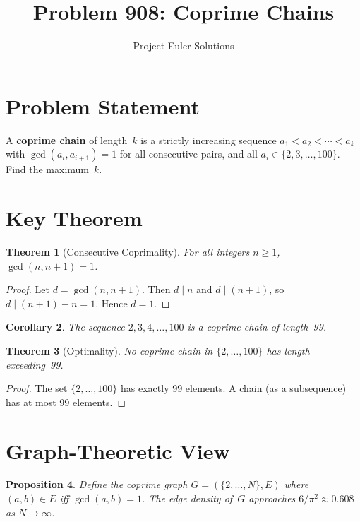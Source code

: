 \documentclass[11pt]{article}
\title{Problem 908: Coprime Chains}
\author{Project Euler Solutions}
\date{}
\newtheorem{theorem}{Theorem}
\newtheorem{corollary}[theorem]{Corollary}
\newtheorem{proposition}[theorem]{Proposition}
\begin{document}
\maketitle

\section{Problem Statement}

A \textbf{coprime chain} of length~$k$ is a strictly increasing sequence $a_1 < a_2 < \cdots < a_k$ with $\gcd(a_i, a_{i+1}) = 1$ for all consecutive pairs, and all $a_i \in \{2, 3, \ldots, 100\}$. Find the maximum~$k$.

\section{Key Theorem}

\begin{theorem}[Consecutive Coprimality]
For all integers $n \ge 1$, $\gcd(n, n+1) = 1$.
\end{theorem}

\begin{proof}
Let $d = \gcd(n, n+1)$. Then $d \mid n$ and $d \mid (n+1)$, so $d \mid (n+1) - n = 1$. Hence $d = 1$.
\end{proof}

\begin{corollary}
The sequence $2, 3, 4, \ldots, 100$ is a coprime chain of length~99.
\end{corollary}

\begin{theorem}[Optimality]
No coprime chain in $\{2, \ldots, 100\}$ has length exceeding~99.
\end{theorem}

\begin{proof}
The set $\{2, \ldots, 100\}$ has exactly 99 elements. A chain (as a subsequence) has at most 99 elements.
\end{proof}

\section{Graph-Theoretic View}

\begin{proposition}
Define the coprime graph $G = (\{2,\ldots,N\}, E)$ where $(a,b) \in E$ iff $\gcd(a,b) = 1$. The edge density of~$G$ approaches $6/\pi^2 \approx 0.608$ as $N \to \infty$.
\end{proposition}
\end{document}
